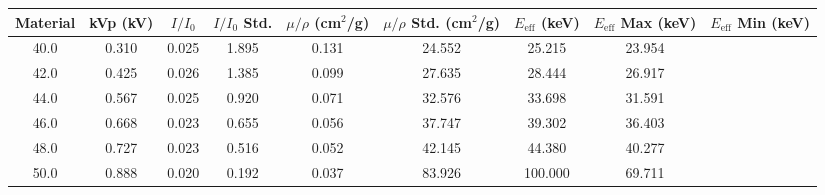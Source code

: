 \begin{tabular}{ccccccccc}
\toprule
 Material & kVp (kV) &  $I/I_0$ &  $I/I_0$ Std. &  $\mu/\rho$ (cm$^2$/g) &  $\mu/\rho$ Std. (cm$^2$/g) &  $E_{\text{eff}}$ (keV) &  $E_{\text{eff}}$ Max (keV) &  $E_{\text{eff}}$ Min (keV) \\
\midrule
     40.0 &    0.310 &         0.025 &                  1.895 &                       0.131 &                  24.552 &                      25.215 &                      23.954 \\
     42.0 &    0.425 &         0.026 &                  1.385 &                       0.099 &                  27.635 &                      28.444 &                      26.917 \\
     44.0 &    0.567 &         0.025 &                  0.920 &                       0.071 &                  32.576 &                      33.698 &                      31.591 \\
     46.0 &    0.668 &         0.023 &                  0.655 &                       0.056 &                  37.747 &                      39.302 &                      36.403 \\
     48.0 &    0.727 &         0.023 &                  0.516 &                       0.052 &                  42.145 &                      44.380 &                      40.277 \\
     50.0 &    0.888 &         0.020 &                  0.192 &                       0.037 &                  83.926 &                     100.000 &                      69.711 \\
\bottomrule
\end{tabular}
